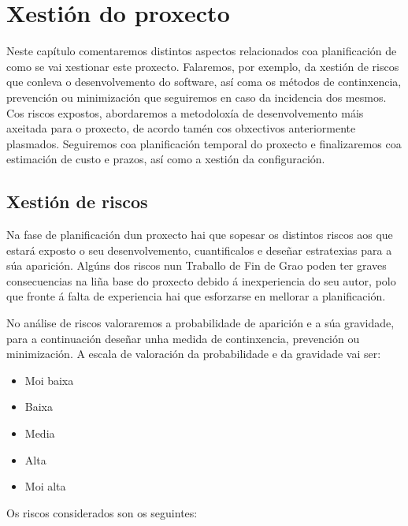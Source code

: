 \chapter{Xestión do proxecto}

Neste capítulo comentaremos distintos aspectos relacionados coa planificación de como se vai xestionar este proxecto. Falaremos, por exemplo, da xestión de riscos que conleva o desenvolvemento do software, así coma os métodos de continxencia, prevención ou minimización que seguiremos en caso da incidencia dos mesmos. Cos riscos expostos, abordaremos a metodoloxía de desenvolvemento máis axeitada para o proxecto, de acordo tamén cos obxectivos anteriormente plasmados. Seguiremos coa planificación temporal do proxecto e finalizaremos coa estimación de custo e prazos, así como a xestión da configuración. 

\section{Xestión de riscos}

Na fase de planificación dun proxecto hai que sopesar os distintos riscos aos que estará exposto o seu desenvolvemento, cuantificalos e deseñar estratexias para a súa aparición. Algúns dos riscos nun Traballo de Fin de Grao poden ter graves consecuencias na liña base do proxecto debido á inexperiencia do seu autor, polo que fronte á falta de experiencia hai que esforzarse en mellorar a planificación.

No análise de riscos valoraremos a probabilidade de aparición e a súa gravidade, para a continuación deseñar unha medida de continxencia, prevención ou minimización. A escala de valoración da probabilidade e da gravidade vai ser:

\begin{itemize}
\item Moi baixa
\item Baixa
\item Media
\item Alta
\item Moi alta
\end{itemize} 

Os riscos considerados son os seguintes:

